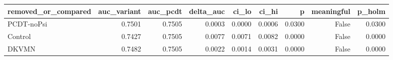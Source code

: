 \begin{tabular}{lrrrrrrrr}
\toprule
removed\_or\_compared & auc\_variant & auc\_pcdt & delta\_auc & ci\_lo & ci\_hi & p & meaningful & p\_holm \\
\midrule
PCDT-noPsi & 0.7501 & 0.7505 & 0.0003 & 0.0000 & 0.0006 & 0.0300 & False & 0.0300 \\
Control & 0.7427 & 0.7505 & 0.0077 & 0.0071 & 0.0082 & 0.0000 & False & 0.0000 \\
DKVMN & 0.7482 & 0.7505 & 0.0022 & 0.0014 & 0.0031 & 0.0000 & False & 0.0000 \\
\bottomrule
\end{tabular}
